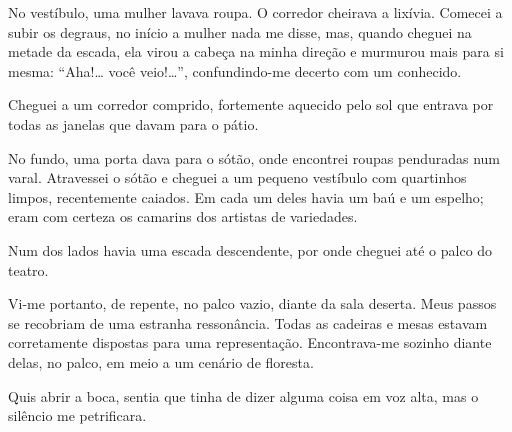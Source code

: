  

No vestíbulo, uma mulher lavava roupa. O corredor cheirava a lixívia. Comecei
a subir os degraus, no início a mulher nada me disse, mas, quando cheguei na
metade da escada, ela virou a cabeça na minha direção e murmurou mais para si
mesma: ``Aha!\ldots{} você veio!\ldots{}'', confundindo-me decerto com um
conhecido.


Cheguei a um corredor comprido, fortemente aquecido pelo sol que entrava por
todas as janelas que davam para o pátio.


No fundo, uma porta dava para o sótão, onde encontrei roupas penduradas num
varal. Atravessei o sótão e cheguei a um pequeno vestíbulo com quartinhos
limpos, recentemente caiados. Em cada um deles havia um baú e um espelho;
eram com certeza os camarins dos artistas de variedades.

Num dos lados havia uma escada descendente, por onde cheguei até o palco do
teatro.

Vi-me portanto, de repente, no palco vazio, diante da sala deserta. Meus
passos se recobriam de uma estranha ressonância. Todas as cadeiras e mesas
estavam corretamente dispostas para uma representação. Encontrava-me sozinho
diante delas, no palco, em meio a um cenário de floresta.

Quis abrir a boca, sentia que tinha de dizer alguma coisa em voz alta, mas o
silêncio me petrificara.

